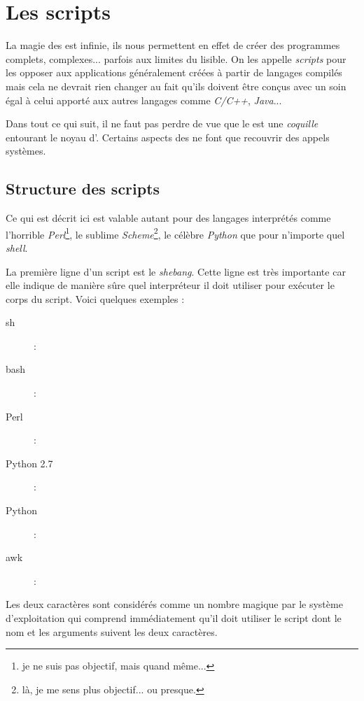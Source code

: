 
\section{Les scripts \shell}
La magie des \shells est infinie, ils nous permettent en effet de créer des programmes complets, complexes... parfois aux limites du lisible. On les appelle \emph{scripts} pour les opposer aux applications généralement créées à partir de langages compilés mais cela ne devrait rien changer au fait qu'ils doivent être conçus avec un soin égal à celui apporté aux autres langages comme \emph{C/C++}, \emph{Java}...

Dans tout ce qui suit, il ne faut pas perdre de vue que le \shell est une \emph{coquille} entourant le noyau d'\unix. Certains aspects des \shells ne font que recouvrir des appels systèmes.

\subsection{Structure des scripts}
Ce qui est décrit ici est valable autant pour des langages interprétés comme l'horrible \emph{Perl}\footnote{je ne suis pas objectif, mais quand même...}, le sublime \emph{Scheme}\footnote{là, je me sens plus objectif... ou presque.}, le célèbre \emph{Python} que pour n'importe quel \emph{shell}.

La première ligne d'un script est le \emph{shebang}. Cette ligne est très importante car elle indique de manière sûre quel interpréteur il doit utiliser pour exécuter le corps du script. Voici quelques exemples :

\begin{description}
\item[sh] : 
\item[bash] : 
\item[Perl] : 
\item[Python 2.7] : 
\item[Python] : 
\item[awk] : 
\end{description}

Les deux caractères \code{\#!} sont considérés comme un nombre magique par le système d'exploitation qui comprend immédiatement qu'il doit utiliser le script dont le nom et les arguments suivent les deux caractères.

